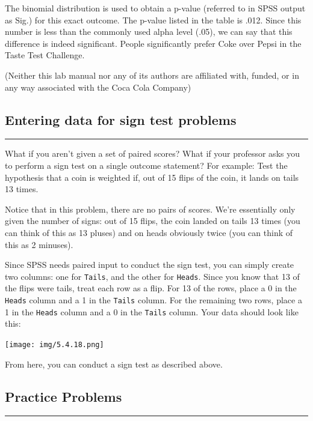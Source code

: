 \documentclass[]{book}
\begin{document}
The binomial distribution is used to obtain a p-value (referred to in
SPSS output as Sig.) for this exact outcome. The p-value listed in the
table is .012. Since this number is less than the commonly used alpha
level (.05), we can say that this difference is indeed significant.
People significantly prefer Coke over Pepsi in the Taste Test Challenge.

(Neither this lab manual nor any of its authors are affiliated with,
funded, or in any way associated with the Coca Cola Company)

\subsection{Entering data for sign test
problems}\label{entering-data-for-sign-test-problems}

\begin{center}\rule{0.5\linewidth}{0.5pt}\end{center}

What if you aren't given a set of paired scores? What if your professor
asks you to perform a sign test on a single outcome statement? For
example: Test the hypothesis that a coin is weighted if, out of 15 flips
of the coin, it lands on tails 13 times.

Notice that in this problem, there are no pairs of scores. We're
essentially only given the number of signs: out of 15 flips, the coin
landed on tails 13 times (you can think of this as 13 pluses) and on
heads obviously twice (you can think of this as 2 minuses).

Since SPSS needs paired input to conduct the sign test, you can simply
create two columns: one for \texttt{Tails}, and the other for
\texttt{Heads}. Since you know that 13 of the flips were tails, treat
each row as a flip. For 13 of the rows, place a 0 in the \texttt{Heads}
column and a 1 in the \texttt{Tails} column. For the remaining two rows,
place a 1 in the \texttt{Heads} column and a 0 in the \texttt{Tails}
column. Your data should look like this:

\texttt{[image: img/5.4.18.png]}

From here, you can conduct a sign test as described above.

\subsection{Practice Problems}\label{practice-problems-4}

\begin{center}\rule{0.5\linewidth}{0.5pt}\end{center}
\end{document}
